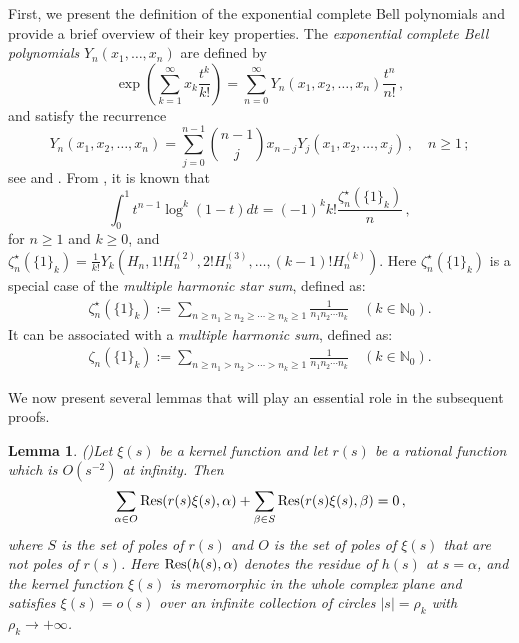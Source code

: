\documentclass[11pt]{article}
\def\N{\mathbb{N}}
\theoremstyle{plain}
\newtheorem{lem}[thm]{Lemma}
\theoremstyle{definition}
\begin{document}
First, we present the definition of the exponential complete Bell polynomials and provide a brief overview of their key properties. The \emph{exponential complete Bell polynomials} $Y_n(x_1,\ldots,x_n)$ are defined by
\begin{equation}\label{cBell.gf}
\exp\left(\sum_{k=1}^{\infty}x_k\frac{t^k}{k!}\right)
    =\sum_{n=0}^{\infty}Y_n(x_1,x_2,\ldots,x_n)\frac{t^n}{n!}\,,
\end{equation}
and satisfy the recurrence
\begin{equation}\label{cBell.rec}
Y_n(x_1,x_2,\ldots,x_n)=\sum_{j=0}^{n-1}\binom{n-1}{j}x_{n-j}Y_j(x_1,x_2,\ldots,x_j)
    \,,\quad n\geq1\,;
\end{equation}
see \cite[Section 3.3]{C1974} and \cite[Section 2.8]{Riordan58}. From \cite[Eqs. (2.5) and (2.9)]{Xu17.MZVES}, it is known that
\begin{equation}\label{zn*1k}
\int_0^1t^{n-1}\log^k(1-t)dt
    =(-1)^kk!\frac{\zeta_n^\star(\{1\}_k)}{n}\,,
\end{equation}
for $n\geq1$ and $k\geq0$, and $\zeta_n^\star(\{1\}_k)=\frac{1}{k!}Y_k(H_n,1!H_n^{(2)},2!H_n^{(3)},\ldots,(k-1)!H_n^{(k)})$. Here $\zeta^\star_n(\{1\}_k)$ is a special case of the \emph{multiple harmonic star sum}, defined as:
\begin{align}\label{defn-MHSS-1}
\zeta^\star_n(\{1\}_k):=\sum_{n\geq n_1\geq n_2\geq \cdots \geq n_k\geq 1} \frac1{n_1n_2\cdots n_k}\quad (k\in\N_0).
\end{align}
It can be associated with a \emph{multiple harmonic sum}, defined as:
\begin{align}\label{defn-MHS-1}
\zeta_n(\{1\}_k):=\sum_{n\geq n_1>n_2> \cdots > n_k\geq 1} \frac1{n_1n_2\cdots n_k}\quad (k\in\N_0).
\end{align}

We now present several lemmas that will play an essential role in the subsequent proofs.

\begin{lem}(\cite[Lemma 2.1]{Flajolet-Salvy})\label{Lem.Res}
Let $\xi(s)$ be a kernel function and let $r(s)$ be a rational function which is $O(s^{-2})$ at infinity. Then
\begin{equation}\label{Cau.Lind}
\sum_{\alpha \in O}{\rm Res}(r(s)\xi(s),\alpha)
    +\sum_{\beta\in S}{\rm Res}(r(s)\xi(s),\beta)=0\,,
\end{equation}
where $S$ is the set of poles of $r(s)$ and $O$ is the set of poles of $\xi(s)$ that are not poles of $r(s)$. Here ${\rm Res}(h(s),\alpha)$ denotes the residue of $h(s)$ at $s=\alpha$, and the kernel function $\xi(s)$ is meromorphic in the whole complex plane and satisfies $\xi(s)=o(s)$ over an infinite collection of circles $|s|=\rho_k$ with $\rho_k\to+\infty$.
\end{lem}
\end{document}
